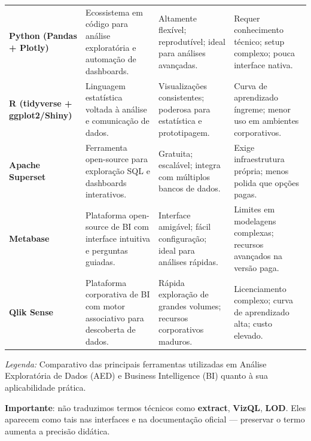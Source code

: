 \begin{table}[H]
\begin{tabular}{p{2.8cm} p{4cm} p{4cm} p{4cm}}
\textbf{Python (Pandas + Plotly)} &
Ecossistema em código para análise exploratória e automação de dashboards. &
Altamente flexível; reprodutível; ideal para análises avançadas. &
Requer conhecimento técnico; setup complexo; pouca interface nativa. \\

\textbf{R (tidyverse + ggplot2/Shiny)} &
Linguagem estatística voltada à análise e comunicação de dados. &
Visualizações consistentes; poderosa para estatística e prototipagem. &
Curva de aprendizado íngreme; menor uso em ambientes corporativos. \\

\textbf{Apache Superset} &
Ferramenta open-source para exploração SQL e dashboards interativos. &
Gratuita; escalável; integra com múltiplos bancos de dados. &
Exige infraestrutura própria; menos polida que opções pagas. \\

\textbf{Metabase} &
Plataforma open-source de BI com interface intuitiva e perguntas guiadas. &
Interface amigável; fácil configuração; ideal para análises rápidas. &
Limites em modelagens complexas; recursos avançados na versão paga. \\

\textbf{Qlik Sense} &
Plataforma corporativa de BI com motor associativo para descoberta de dados. &
Rápida exploração de grandes volumes; recursos corporativos maduros. &
Licenciamento complexo; curva de aprendizado alta; custo elevado. \\ \hline
\end{tabular}

\vspace{0.2cm}
\footnotesize
\textit{Legenda:} Comparativo das principais ferramentas utilizadas em Análise Exploratória de Dados (AED) e Business Intelligence (BI) quanto à sua aplicabilidade prática.

\end{table}

\begin{NoteBox}
\textbf{Importante}: não traduzimos termos técnicos como \textbf{extract}, \textbf{VizQL}, \textbf{LOD}. 
Eles aparecem como tais nas interfaces e na documentação oficial — preservar o termo aumenta a precisão didática.
\end{NoteBox}


